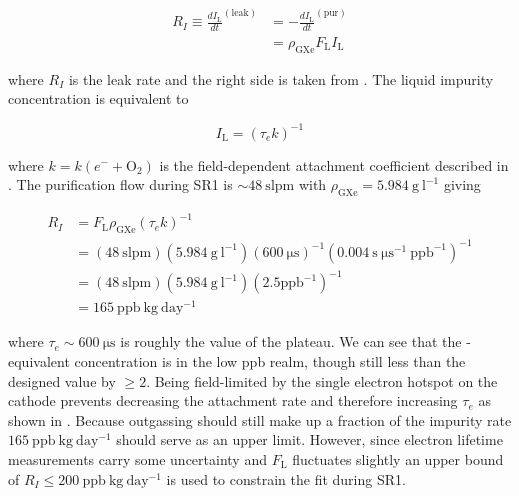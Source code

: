 \begin{equation}
\begin{aligned}
R_I \equiv \frac{dI_{\mathrm{L}}}{dt}^{(\mathrm{leak})} &= -\frac{dI_{\mathrm{L}}}{dt}^{(\mathrm{pur})}
\\
&= \rho_{\mathrm{GXe}} F_{\mathrm{L}} I_{\mathrm{L}}
\end{aligned}
\end{equation}

\noindent where $R_I$ is the leak rate and the right side is taken from .  The liquid
impurity concentration is equivalent to

\begin{equation}
I_{\mathrm{L}} = ( \tau_e k)^{-1}
\end{equation}

\noindent where $k = k(e^- + \mathrm{O_2})$ is the field-dependent \electron attachment coefficient described in
.  The purification flow during SR1 is ${\sim} 48\ \mathrm{slpm}$ with
$\rho_{\mathrm{GXe}} = 5.984\ \mathrm{g\ l^{-1}}$ giving

\begin{equation}
\begin{aligned}
R_I &= F_{\mathrm{L}} \rho_{\mathrm{GXe}} (\tau_e k)^{-1} \\[2pt]
&= (48\ \mathrm{slpm}) (5.984\ \mathrm{g\ l^{-1}}) (600\ \mathrm{\mu s})^{-1} (0.004\ \mathrm{s\ \mu s^{-1}\ ppb^{-1}})^{-1} \\[2pt]
&= (48\ \mathrm{slpm}) (5.984\ \mathrm{g\ l^{-1}}) (2.5 \mathrm{ppb^{-1}})^{-1} \\[2pt]
&= 165\ \mathrm{ppb\ kg\ day^{-1}}
\label{eq:electron_lifetime_model_outgassing_leak}
\end{aligned}
\end{equation}

\noindent where $\tau_e \sim 600\ \mathrm{\mu s}$ is roughly the value of the plateau.  We can see that the -equivalent
concentration is in the low ppb realm, though still less than the designed value by $\geq 2$.  Being field-limited by the single electron
hotspot on the cathode prevents decreasing the attachment rate and therefore increasing $\tau_e$ as shown in
.  Because outgassing should still make up a fraction
of the impurity rate $165\ \mathrm{ppb\ kg\ day^{-1}}$  should serve as an upper limit.  However, since electron lifetime measurements
carry some uncertainty and $F_{\mathrm{L}}$ fluctuates slightly an upper bound of $R_I \leq 200\ \mathrm{ppb\ kg\ day^{-1}}$ is used to
constrain the fit during SR1.

